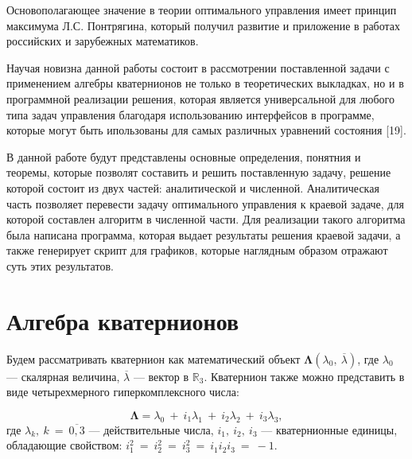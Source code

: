 \documentclass[14pt]{extreport}
\begin{document}
Основополагающее значение в теории оптимального управления имеет принцип максимума Л.С. Понтрягина,
который получил развитие и приложение в работах российских и зарубежных математиков.

Научая новизна данной работы состоит в рассмотрении поставленной задачи с применением алгебры кватернионов не только в теоретических выкладках,
но и в программной реализации решения, которая является универсальной для любого типа задач управления благодаря использованию интерфейсов
в программе, которые могут быть ипользованы для самых различных уравнений состояния [19].

В данной работе будут представлены основные определения, понятния и теоремы, которые позволят составить и решить поставленную задачу,
решение которой состоит из двух частей: аналитической и численной. Аналитическая часть позволяет перевести задачу оптимального управления
к краевой задаче, для которой составлен алгоритм в численной части. Для реализации такого алгоритма была написана программа,
которая выдает результаты решения краевой задачи, а также генерирует скрипт для графиков, которые наглядным образом отражают
суть этих результатов.


\chapter{Алгебра кватернионов}

Будем рассматривать кватернион как математический объект $\boldsymbol{\Lambda}(\lambda_0,\ \overline{\lambda})$,
где $\lambda_0$ --- скалярная величина, $\overline{\lambda}$ --- вектор в $\mathbb{R}_3$.
Кватернион также можно представить в виде четырехмерного гиперкомплексного числа:

\begin{equation}
 \boldsymbol\Lambda = \lambda_0\ + \ i_1\lambda_1\ + \ i_2\lambda_2\ + \ i_3\lambda_3,
\end{equation}
где $\lambda_k,\ k\ =\ \overline{0, 3}$ --- действительные числа, $i_1,\ i_2,\ i_3$ --- кватернионные единицы, обладающие свойством: 
$i_1^2\ =\ i_2^2\ =\ i_3^2\ =\ i_1i_2i_3\ =\ -1.$
\end{document}
